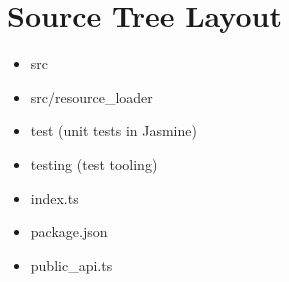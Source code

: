 \section{Source Tree Layout}


\begin{itemize}
  \item src
  \item src/resource\_loader
  \item test (unit tests in Jasmine)
  \item testing (test tooling)
\end{itemize}


\begin{itemize}
  \item index.ts
  \item package.json
  \item public\_api.ts
\end{itemize}
